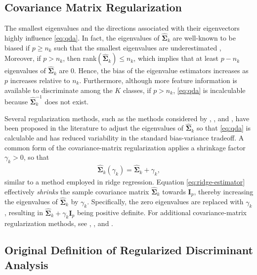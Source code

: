 \documentclass[11pt]{article}
\begin{document}
\subsection{Covariance Matrix Regularization}

The smallest eigenvalues and the directions associated with their eigenvectors highly influence \eqref{eq:qda}. In fact, the eigenvalues of $\widehat{\bm \Sigma}_k$ are well-known to be biased if $p \ge n_k$ such that the smallest eigenvalues are underestimated \citep{Seber:2004uh}, Moreover, if $p > n_k$, then rank$(\widehat{\bm \Sigma}_k) \le n_k$, which implies that at least $p - n_k$ eigenvalues of $\widehat{\bm \Sigma}_k$ are 0. Hence, the bias of the eigenvalue estimators increases as $p$ increases relative to $n_k$. Furthermore, although more feature information is available to discriminate among the $K$ classes, if $p > n_k$, \eqref{eq:qda} is incalculable because $\widehat{\bm \Sigma}_k^{-1}$ does not exist.

Several regularization methods, such as the methods considered by \citet*{Guo:2007te}, \cite{Mkhadri:1995jp}, and \citet*{Xu:2009fl}, have been proposed in the literature to adjust the eigenvalues of $\widehat{\bm \Sigma}_k$ so that \eqref{eq:qda} is calculable and has reduced variability in the standard bias-variance tradeoff.  A common form of the covariance-matrix regularization applies a shrinkage factor $\gamma_k > 0$, so that
\begin{align}
	\widehat{\bm \Sigma}_k(\gamma_k) =  \widehat{\bm \Sigma}_k + \gamma_k, \label{eq:ridge-estimator}
\end{align}
similar to a method employed in ridge regression. Equation \eqref{eq:ridge-estimator} effectively \emph{shrinks} the sample covariance matrix $\widehat{\bm\Sigma}_k$ towards $\bm I_p$, thereby increasing the eigenvalues of $\widehat{\bm\Sigma}_k$ by $\gamma_k$. Specifically, the zero eigenvalues are replaced with $\gamma_k$, resulting in $\widehat{\bm \Sigma}_k + \gamma_k \bm I_p$ being positive definite. For additional covariance-matrix regularization methods, see \cite{Ramey:2011ji}, \cite{Xu:2009fl}, and \cite{Ye:2009gd}.

\subsection{Original Definition of Regularized Discriminant Analysis}
\end{document}
